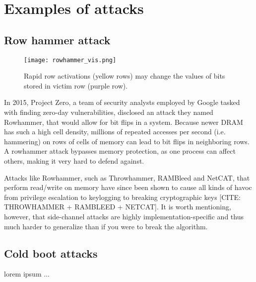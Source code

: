 \section{Examples of attacks}
\subsection{Row hammer attack}
\begin{wrapfigure}{r}{0.4\textwidth}
  \begin{center}
    \texttt{[image: rowhammer\_vis.png]}
  \end{center}
  \caption{Rapid row activations (yellow rows) may change the values of bits stored in victim row (purple row).}
\end{wrapfigure}

In 2015, Project Zero, a team of security analysts employed by Google tasked with finding zero-day vulnerabilities, disclosed an attack they named Rowhammer, that would allow for bit flips in a system.
Because newer DRAM has such a high cell density, millions of repeated accesses per second (i.e. hammering) on rows of cells of memory can lead to bit flips in neighboring rows.
A rowhammer attack bypasses memory protection, as one process can affect others, making it very hard to defend against.

%

Attacks like Rowhammer, such as Throwhammer, RAMBleed and NetCAT, that perform read/write on memory have since been shown to cause all kinds of havoc from privilege escalation to keylogging to breaking cryptographic keys [CITE: THROWHAMMER + RAMBLEED + NETCAT].
It is worth mentioning, however, that side-channel attacks are highly implementation-specific and thus much harder to generalize than if you were to break the algorithm.

\subsection{Cold boot attacks}
lorem ipsum ...

